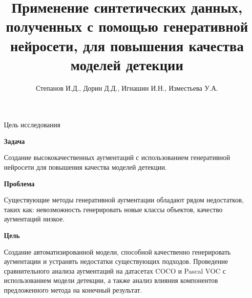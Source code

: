\documentclass{beamer}
\title[\hbox to 56mm{Генерация}]{Применение синтетических данных, полученных с помощью генеративной нейросети, для повышения качества моделей детекции}
\author[N.\,P.~Ivkin]{Степанов И.Д., Дорин Д.Д., Игнашин И.Н., Изместьева У.А.}
\institute{Московский физико-технический институт}
\date{\footnotesize
\par\smallskip\emph{Научный руководитель:} к.ф-м.н. Грабовой Андрей Валерьевич
\par\smallskip\emph{Консультант:} Филатов Андрей Викторович
\par\bigskip\small 2025}
\begin{document}
\begin{frame}
\thispagestyle{empty}
\maketitle
\end{frame}
\begin{frame}{Цель исследования}


\textbf{Задача} 

Создание высококачественных аугментаций с использованием генеративной нейросети для повышения качества моделей детекции.

\vspace{5pt} %

\textbf{Проблема} 

Существующие методы генеративной аугментации обладают рядом недостатков, таких как: невозможность генерировать новые классы объектов, качество аугментаций низкое.

\vspace{5pt} %

\textbf{Цель} 

Создание автоматизированной модели, способной качественно генерировать аугментации и устранять недостатки существующих подходов. Проведение сравнительного анализа аугментаций на датасетах COCO и Pascal VOC с использованием модели детекции, а также анализ влияния компонентов предложенного метода на конечный результат.

\end{frame}
\end{document}
